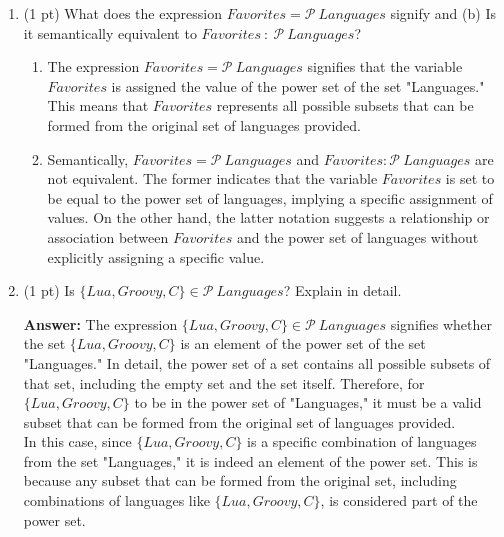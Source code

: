 \documentclass[12pt]{article}
\begin{document}
\begin{spacing}{1.5}
\begin{enumerate}
		\item (1 pt) What does the expression $Favorites = \mathcal{P} \: Languages$ signify and (b) Is it semantically equivalent to $Favorites \: : \: \mathcal{P} \: Languages$?
		      		      		      		      
		      \begin{enumerate}
		      	\item The expression $Favorites = \mathcal{P} \: Languages$ signifies that the variable $Favorites$ is assigned the value of the power set of the set "Languages." This means that $Favorites$ represents all possible subsets that can be formed from the original set of languages provided. 
		      	      		      	      		      	      		      	                      
		      	\item Semantically, $Favorites = \mathcal{P} \: Languages$ and $Favorites : \mathcal{P} \: Languages$ are not equivalent. The former indicates that the variable $Favorites$ is set to be equal to the power set of languages, implying a specific assignment of values. On the other hand, the latter notation suggests a relationship or association between $Favorites$ and the power set of languages without explicitly assigning a specific value.\\
		      \end{enumerate}
		      		      		      		                  
		\item (1 pt) Is $\{Lua, Groovy, C\} \in \mathcal{P} \: Languages$? Explain in detail.
		      		      		      		      
		      \textbf{Answer:} The expression $\{Lua, Groovy, C\} \in \mathcal{P} \: Languages$ signifies whether the set $\{Lua, Groovy, C\}$ is an element of the power set of the set "Languages." In detail, the power set of a set contains all possible subsets of that set, including the empty set and the set itself. Therefore, for $\{Lua, Groovy, C\}$ to be in the power set of "Languages," it must be a valid subset that can be formed from the original set of languages provided.\\
		      		      		      		                  
		      In this case, since $\{Lua, Groovy, C\}$ is a specific combination of languages from the set "Languages," it is indeed an element of the power set. This is because any subset that can be formed from the original set, including combinations of languages like $\{Lua, Groovy, C\}$, is considered part of the power set.\\
		      		      		      		                  

\end{enumerate}
\end{spacing}
\end{document}
